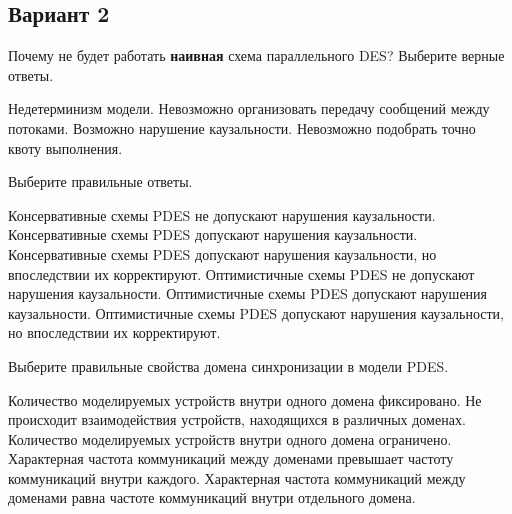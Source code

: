 \subsection*{Вариант 2}

\begin{questions}

\question[3] Почему не будет работать \textbf{наивная} схема параллельного DES? Выберите верные ответы.
\begin{choices}
    \correctchoice Недетерминизм модели.
    \choice Невозможно организовать передачу сообщений между потоками.
    \correctchoice Возможно нарушение каузальности.
    \choice Невозможно подобрать точно квоту выполнения.
\end{choices}


\question[3] Выберите правильные ответы.
\begin{choices}
    \correctchoice Консервативные схемы PDES не допускают нарушения каузальности.
    \choice Консервативные схемы PDES допускают нарушения каузальности.
    \choice Консервативные схемы PDES допускают нарушения каузальности, но впоследствии их корректируют.
    \choice Оптимистичные схемы PDES не допускают нарушения каузальности.
    \choice Оптимистичные схемы PDES допускают нарушения каузальности.
    \correctchoice Оптимистичные схемы PDES допускают нарушения каузальности, но впоследствии их корректируют.
\end{choices}

\question[3] Выберите правильные свойства домена синхронизации в модели PDES.
\begin{choices}
    \choice Количество моделируемых устройств внутри одного домена фиксировано.
    \choice Не происходит взаимодействия устройств, находящихся в различных доменах.
    \choice Количество моделируемых устройств внутри одного домена ограничено.
    \correctchoice Характерная частота коммуникаций  между доменами превышает частоту коммуникаций внутри каждого.
    \choice Характерная частота коммуникаций  между доменами равна частоте коммуникаций внутри отдельного домена.
\end{choices}


\end{questions}
